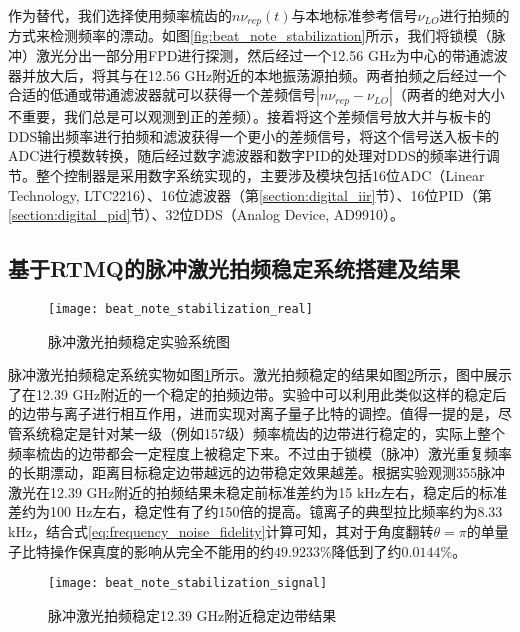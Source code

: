 作为替代，我们选择使用频率梳齿的$n\nu_{rep}(t)$与本地标准参考信号$\nu_{LO}$进行拍频的方式来检测频率的漂动。如图\ref{fig:beat_note_stabilization}所示，我们将锁模（脉冲）激光分出一部分用FPD进行探测，然后经过一个12.56 GHz为中心的带通滤波器并放大后，将其与在12.56 GHz附近的本地振荡源拍频。两者拍频之后经过一个合适的低通或带通滤波器就可以获得一个差频信号$|n\nu_{rep}-\nu_{LO}|$（两者的绝对大小不重要，我们总是可以观测到正的差频）。接着将这个差频信号放大并与板卡的DDS输出频率进行拍频和滤波获得一个更小的差频信号，将这个信号送入板卡的ADC进行模数转换，随后经过数字滤波器和数字PID的处理对DDS的频率进行调节。整个控制器是采用数字系统实现的，主要涉及模块包括16位ADC（Linear Technology, LTC2216）、16位滤波器（第\ref{section:digital_iir}节）、16位PID（第\ref{section:digital_pid}节）、32位DDS（Analog Device, AD9910）。



\subsection[基于RTMQ的脉冲激光拍频稳定系统搭建及结果]{基于RTMQ的脉冲激光拍频稳定系统搭建及结果}


\begin{figure}
    \centering
    \texttt{[image: beat\_note\_stabilization\_real]}
    \caption[脉冲激光拍频稳定实验系统图]{脉冲激光拍频稳定实验系统图\label{fig:beat_note_stabilization_real}}
\end{figure}

脉冲激光拍频稳定系统实物如图\ref{fig:beat_note_stabilization_real}所示。激光拍频稳定的结果如图\ref{fig:beat_note_stabilization_signal}所示，图中展示了在12.39 GHz附近的一个稳定的拍频边带。实验中可以利用此类似这样的稳定后的边带与离子进行相互作用，进而实现对离子量子比特的调控。值得一提的是，尽管系统稳定是针对某一级（例如157级）频率梳齿的边带进行稳定的，实际上整个频率梳齿的边带都会一定程度上被稳定下来。不过由于锁模（脉冲）激光重复频率的长期漂动，距离目标稳定边带越远的边带稳定效果越差。根据实验观测355脉冲激光在12.39 GHz附近的拍频结果未稳定前标准差约为15 kHz左右，稳定后的标准差约为100 Hz左右，稳定性有了约150倍的提高。镱离子的典型拉比频率约为8.33 kHz，结合式\eqref{eq:frequency_noise_fidelity}计算可知，其对于角度翻转$\theta=\pi$的单量子比特操作保真度的影响从完全不能用的约$49.9233\%$降低到了约$0.0144\%$。
\begin{figure}
    \centering
    \texttt{[image: beat\_note\_stabilization\_signal]}
    \caption[脉冲激光拍频稳定12.39 GHz附近稳定边带结果]{脉冲激光拍频稳定12.39 GHz附近稳定边带结果\label{fig:beat_note_stabilization_signal}}
\end{figure}

